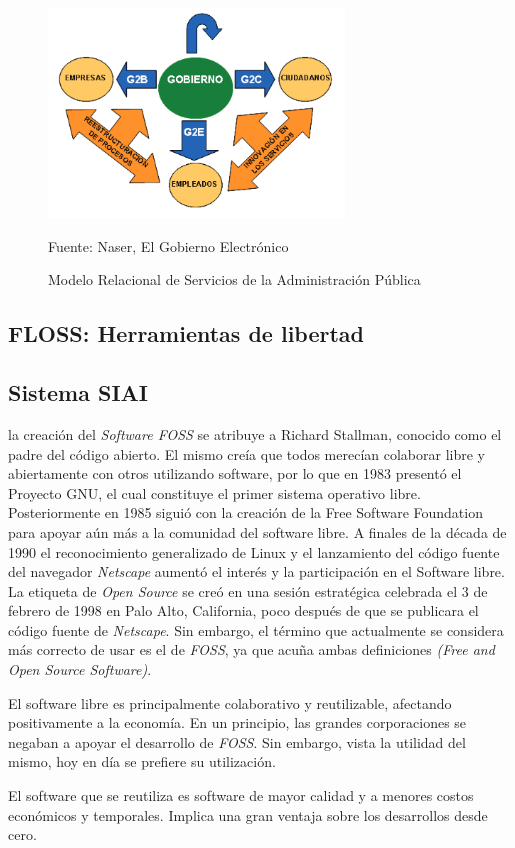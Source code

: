\begin{figure}[!htpb]
    \centering
    \includegraphics[width=0.7\textwidth]{assets/g2all}
    \caption{Modelo Relacional de Servicios de la Administración Pública}{Fuente: Naser, El Gobierno Electrónico}
    \label{fig:g2all}
\end{figure}

\subsection{FLOSS: Herramientas de libertad}

\subsection{Sistema SIAI}


la creación del \textit{Software FOSS} se atribuye a Richard Stallman, conocido
como el padre del código abierto. El mismo creía que todos merecían colaborar
libre y abiertamente con otros utilizando software, por lo que en 1983 presentó
el Proyecto GNU, el cual constituye el primer sistema operativo libre.
Posteriormente en 1985 siguió con la creación de la Free Software Foundation
para apoyar aún más a la comunidad del software libre. A finales de la década de
1990 el reconocimiento generalizado de Linux y el lanzamiento del código fuente
del navegador \textit{Netscape} aumentó el interés y la participación en el
Software libre. La etiqueta de \textit{Open Source} se creó en una sesión
estratégica celebrada el 3 de febrero de 1998 en Palo Alto, California, poco
después de que se publicara el código fuente de \textit{Netscape}. Sin embargo,
el término que actualmente se considera más correcto de usar es el de
\textit{FOSS}, ya que acuña ambas definiciones \textit{(Free and Open Source
    Software)}.

El software libre es principalmente colaborativo y reutilizable, afectando
positivamente a la economía. En un principio, las grandes corporaciones se
negaban a apoyar el desarrollo de \textit{FOSS}. Sin embargo, vista la utilidad
del mismo, hoy en día se prefiere su utilización.

El software que se reutiliza es software de mayor calidad y a menores costos
económicos y temporales. Implica una gran ventaja sobre los desarrollos desde
cero.